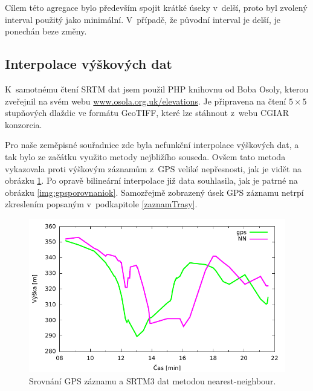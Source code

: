 \documentclass[thesis=B,czech]{FITthesis}[2012/06/26]
\begin{document}
Cílem této agregace bylo především spojit krátké úseky v~delší, proto byl zvolený interval použitý jako minimální. V~případě, že původní interval je delší, je ponechán beze změny. 

\subsection{Interpolace výškových dat}
K~samotnému čtení SRTM dat jsem použil PHP knihovnu od Boba Osoly, kterou zveřejnil na svém webu \href{http://www.osola.org.uk/elevations}{www.osola.org.uk/elevations}. Je připravena na čtení $5 \times 5$ stupňových dlaždic ve formátu GeoTIFF, které lze stáhnout z~webu CGIAR konzorcia. 

Pro naše zeměpisné souřadnice zde byla nefunkční interpolace výškových dat, a tak bylo ze začátku využito metody nejbližího souseda. Ovšem tato metoda vykazovala proti výškovým záznamům z~GPS veliké nepřesnosti, jak je vidět na obrázku \ref{img:gpsporovnani}. Po opravě bilineární interpolace již data souhlasila, jak je patrné na obrázku \ref{img:gpsporovnaniok}. Samozřejmě zobrazený úsek GPS záznamu netrpí zkreslením popsaným v~podkapitole \ref{zaznamTrasy}.


 \begin{figure}[p]\centering
 	\includegraphics[page=1]{grafy/porovnani.pdf}
 	\caption{Srovnání GPS záznamu a SRTM3 dat metodou nearest-neighbour.}
 	\label{img:gpsporovnani}
 \end{figure}
\end{document}
